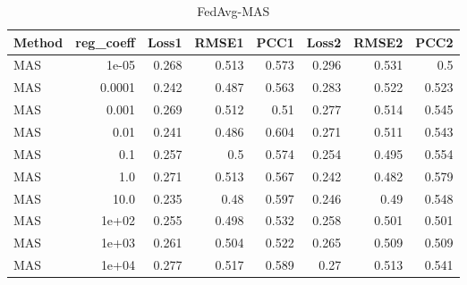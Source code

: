 \begin{table}
\caption{FedAvg-MAS}
\begin{tabular}{lrrrrrrr}
\toprule
Method & reg_coeff & Loss1 & RMSE1 & PCC1 & Loss2 & RMSE2 & PCC2 \\
\midrule
MAS & 1e-05 & 0.268 & 0.513 & 0.573 & 0.296 & 0.531 & 0.5 \\
MAS & 0.0001 & 0.242 & 0.487 & 0.563 & 0.283 & 0.522 & 0.523 \\
MAS & 0.001 & 0.269 & 0.512 & 0.51 & 0.277 & 0.514 & 0.545 \\
MAS & 0.01 & 0.241 & 0.486 & 0.604 & 0.271 & 0.511 & 0.543 \\
MAS & 0.1 & 0.257 & 0.5 & 0.574 & 0.254 & 0.495 & 0.554 \\
MAS & 1.0 & 0.271 & 0.513 & 0.567 & 0.242 & 0.482 & 0.579 \\
MAS & 10.0 & 0.235 & 0.48 & 0.597 & 0.246 & 0.49 & 0.548 \\
MAS & 1e+02 & 0.255 & 0.498 & 0.532 & 0.258 & 0.501 & 0.501 \\
MAS & 1e+03 & 0.261 & 0.504 & 0.522 & 0.265 & 0.509 & 0.509 \\
MAS & 1e+04 & 0.277 & 0.517 & 0.589 & 0.27 & 0.513 & 0.541 \\
\bottomrule
\end{tabular}
\end{table}
